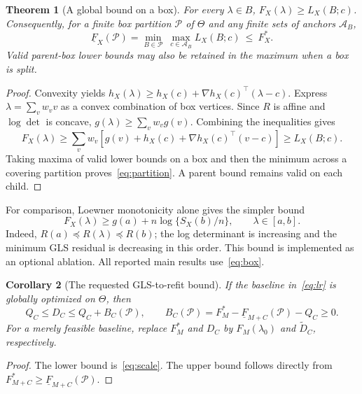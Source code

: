 \documentclass[11pt,a4paper]{article}
\newtheorem{theorem}{Theorem}
\newtheorem{corollary}[theorem]{Corollary}
\theoremstyle{remark}\newtheorem{remark}[theorem]{Remark}
\newcommand{\calP}{\mathcal P}
\begin{document}
\begin{theorem}[A global bound on a box]\label{thm:box}
For every $\lambda\in B$, $F_X(\lambda)\geq L_X(B;c)$. Consequently, for a finite
box partition $\calP$ of $\Theta$ and any finite sets of anchors $\mathcal A_B$,
\begin{equation}\label{eq:partition}
\underline F_X(\calP)=\min_{B\in\calP}\ \max_{c\in\mathcal A_B}L_X(B;c)
\ \leq\ F_X^*.
\end{equation}
Valid parent-box lower bounds may also be retained in the maximum when a box is split.
\end{theorem}
\begin{proof}
Convexity yields $h_X(\lambda)\geq h_X(c)+\nabla h_X(c)^\top(\lambda-c)$.
Express $\lambda=\sum_v w_vv$ as a convex combination of box vertices. Since
$R$ is affine and $\log\det$ is concave,
$g(\lambda)\geq\sum_vw_vg(v)$. Combining the inequalities gives
\[
F_X(\lambda)\geq\sum_vw_v\left[g(v)+h_X(c)+\nabla h_X(c)^\top(v-c)\right]
\geq L_X(B;c).
\]
Taking maxima of valid lower bounds on a box and then the minimum across a covering
partition proves~\eqref{eq:partition}. A parent bound remains valid on each child.
\end{proof}

For comparison, Loewner monotonicity alone gives the simpler bound
\begin{equation}\label{eq:loewner}
F_X(\lambda)\geq g(a)+n\log\{S_X(b)/n\},\qquad \lambda\in[a,b].
\end{equation}
Indeed, $R(a)\preceq R(\lambda)\preceq R(b)$; the log determinant is increasing and
the minimum GLS residual is decreasing in this order. This bound is implemented
as an optional ablation. All reported main results use~\eqref{eq:box}.

\begin{corollary}[The requested GLS-to-refit bound]\label{cor:B}
If the baseline in~\eqref{eq:lr} is globally optimized on $\Theta$, then
\begin{equation}\label{eq:BC}
Q_C\leq D_C\leq Q_C+B_C(\calP),\qquad
B_C(\calP)=F_M^*-\underline F_{M+C}(\calP)-Q_C\geq0.
\end{equation}
For a merely feasible baseline, replace $F_M^*$ and $D_C$ by $F_M(\lambda_0)$ and
$\widetilde D_C$, respectively.
\end{corollary}
\begin{proof}
The lower bound is~\eqref{eq:scale}. The upper bound follows directly from
$F_{M+C}^*\geq\underline F_{M+C}(\calP)$.
\end{proof}
\end{document}
